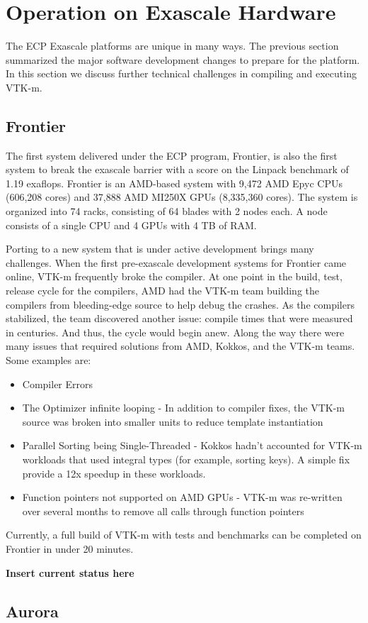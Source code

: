\section{Operation on Exascale Hardware}

The ECP Exascale platforms are unique in many ways.
The previous section summarized the major software development changes to prepare for the platform.
In this section we discuss further technical challenges in compiling and executing VTK-m.


\subsection{Frontier}
The first system delivered under the ECP program, Frontier, is also the first system to break the exascale barrier with a score on the Linpack benchmark of 1.19 exaflops. Frontier is an AMD-based system with 9,472 AMD Epyc CPUs (606,208 cores) and 37,888 AMD MI250X GPUs (8,335,360 cores). The system is organized into 74 racks, consisting of 64 blades with 2 nodes each. A node consists of a single CPU and 4 GPUs with 4 TB of RAM.

Porting to a new system that is under active development brings many challenges. When the first pre-exascale development systems for Frontier came online, VTK-m frequently broke the compiler. At one point in the build, test, release cycle for the compilers, AMD had the VTK-m team building the compilers from bleeding-edge source to help debug the crashes. As the compilers stabilized, the team discovered another issue: compile times that were measured in centuries. And thus, the cycle would begin anew. Along the way there were many issues that required solutions from AMD, Kokkos, and the VTK-m teams. Some examples are:
\begin{itemize}
    \item Compiler Errors
    \item The Optimizer infinite looping - In addition to compiler fixes, the VTK-m source was broken into smaller units to reduce template instantiation
    \item Parallel Sorting being Single-Threaded - Kokkos hadn't accounted for VTK-m workloads that used integral types (for example, sorting keys). A simple fix provide a 12x speedup in these workloads.
    \item Function pointers not supported on AMD GPUs - VTK-m was re-written over several months to remove all calls through function pointers
\end{itemize}
Currently, a full build of VTK-m with tests and benchmarks can be completed on Frontier in under 20 minutes.

\textbf{Insert current status here}


\subsection{Aurora}

